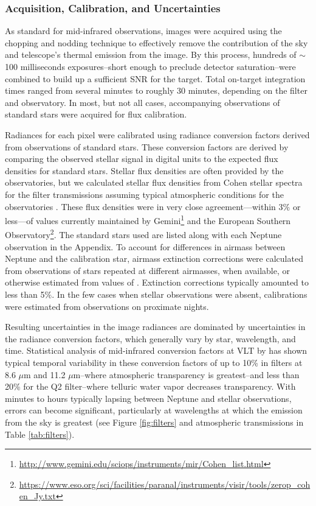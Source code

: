 \documentclass[twocolumn,10pt]{aastex631}
\begin{document}
\subsubsection{Acquisition, Calibration, and Uncertainties} \label{sec:calibration}
As standard for mid-infrared observations, images were acquired using the chopping and nodding technique to effectively remove the contribution of the sky and telescope's thermal emission from the image.  By this process, hundreds of $\sim$100 milliseconds exposures--short enough to preclude detector saturation--were combined to build up a sufficient SNR for the target.  Total on-target integration times ranged from several minutes to roughly 30 minutes, depending on the filter and observatory.  In most, but not all cases, accompanying observations of standard stars were acquired for flux calibration. 

Radiances for each pixel were calibrated using radiance conversion factors derived from observations of standard stars.  These conversion factors are derived by comparing the observed stellar signal in digital units to the expected flux densities for standard stars.  Stellar flux densities are often provided by the observatories, but we calculated stellar flux densities from Cohen stellar spectra \citep[\textit{e.g.},][]{cohen1995spectral} for the filter transmissions assuming typical atmospheric conditions for the observatories \citep{noll2012atmospheric}. These flux densities were in very close agreement---within 3$\%$ or less---of values currently maintained by Gemini\footnote{\url{http://www.gemini.edu/sciops/instruments/mir/Cohen_list.html}} and the European Southern Observatory\footnote{\url{https://www.eso.org/sci/facilities/paranal/instruments/visir/tools/zerop_cohen_Jy.txt}}. The standard stars used are listed along with each Neptune observation in the Appendix.  To account for differences in airmass between Neptune and the calibration star, airmass extinction corrections were calculated from observations of stars repeated at different airmasses, when available, or otherwise estimated from values of \citet{krisciunas1987atmospheric}.  Extinction corrections typically amounted to less than 5$\%$. In the few cases when stellar observations were absent, calibrations were estimated from observations on proximate nights.

Resulting uncertainties in the image radiances are dominated by uncertainties in the radiance conversion factors, which generally vary by star, wavelength, and time. Statistical analysis of mid-infrared conversion factors at VLT by \citet{dobrzycka2008calibrating} has shown typical temporal variability in these conversion factors of up to 10\% in filters at 8.6 $\mu$m and 11.2 $\mu$m--where atmospheric transparency is greatest--and less than 20\% for the Q2 filter--where telluric water vapor decreases transparency.  With minutes to hours typically lapsing between Neptune and stellar observations, errors can become significant, particularly at wavelengths at which the emission from the sky is greatest (see Figure \ref{fig:filters} and atmospheric transmissions in Table \ref{tab:filters}).  
\end{document}
